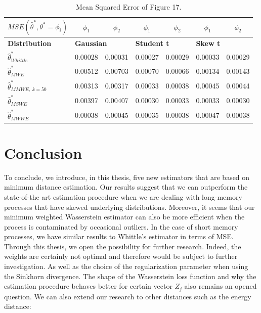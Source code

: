 \documentclass[
  11pt,
]{article}
\begin{document}
\begin{table}[h]
\centering
\begin{tabular}{|l|c|c|c|c|c|c|}
\hline
$MSE(\hat \theta^*, \theta^* = \phi_i)$        & $\phi_1$           & $\phi_2$          & $\phi_1$           & $\phi_2$           & $\phi_1$          & $\phi_2$         \\ \hline
\textbf{Distribution} & \multicolumn{2}{l|}{\textbf{Gaussian}} & \multicolumn{2}{l|}{\textbf{Student t}} & \multicolumn{2}{l|}{\textbf{Skew t}} \\ \hline
$\hat \theta^*_{Whittle}$                & 0.00028              & 0.00031             & 0.00027              & 0.00029              & 0.00033             & 0.00029            \\ \hline
$\hat \theta^*_{MWE}$                   & 0.00512              & 0.00703             & 0.00070             & 0.00066              & 0.00134             & 0.00143            \\ \hline
$\hat \theta^*_{MMWE, \ k = 50}$          & 0.00313              & 0.00317             & 0.00033              & 0.00038              & 0.00045             & 0.00044            \\ \hline
$\hat \theta^*_{MSWE}$                  & 0.00397              & 0.00407             & 0.00030              & 0.00033              & 0.00033             & 0.00030            \\ \hline
$\hat \theta^*_{MWWE}$                  & 0.00038              & 0.00045             & 0.00035              & 0.00038             & 0.00047             & 0.00038            \\ \hline
\end{tabular}
\caption{Mean Squared Error of Figure 17.}
\label{tab:AR2_mse_table}
\end{table}

\hypertarget{conclusion}{%
\section{Conclusion}\label{conclusion}}

To conclude, we introduce, in this thesis, five new estimators that are
based on minimum distance estimation. Our results suggest that we can
outperform the state-of-the art estimation procedure when we are dealing
with long-memory processes that have skewed underlying distributions.
Moreover, it seems that our minimum weighted Wasserstein estimator can
also be more efficient when the process is contaminated by occasional
outliers. In the case of short memory processes, we have similar results
to Whittle's estimator in terms of MSE. Through this thesis, we open the
possibility for further research. Indeed, the weights are certainly not
optimal and therefore would be subject to further investigation. As well
as the choice of the regularization parameter when using the Sinkhorn
divergence. The shape of the Wasserstein loss function and why the
estimation procedure behaves better for certain vector \(Z_j\) also
remains an opened question. We can also extend our research to other
distances such as the energy distance:
\end{document}
